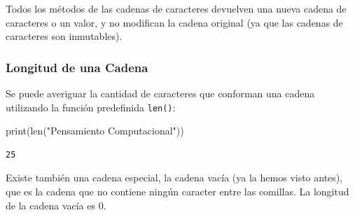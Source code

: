 \documentclass[
  letterpaper,
  DIV=11,
  numbers=noendperiod]{scrreprt}
\newenvironment{Shaded}{\begin{snugshade}}{\end{snugshade}}
\newcommand{\BuiltInTok}[1]{\textcolor[rgb]{0.00,0.23,0.31}{#1}}
\newcommand{\NormalTok}[1]{\textcolor[rgb]{0.00,0.23,0.31}{#1}}
\newcommand{\StringTok}[1]{\textcolor[rgb]{0.13,0.47,0.30}{#1}}
\begin{document}
Todos los métodos de las cadenas de caracteres devuelven una nueva
cadena de caracteres o un valor, y no modifican la cadena original (ya
que las cadenas de caracteres son inmutables).

\hypertarget{longitud-de-una-cadena}{%
\subsubsection{Longitud de una Cadena}\label{longitud-de-una-cadena}}

Se puede averiguar la cantidad de caracteres que conforman una cadena
utilizando la función predefinida \texttt{len()}:

\begin{Shaded}
\begin{Highlighting}[]
\BuiltInTok{print}\NormalTok{(}\BuiltInTok{len}\NormalTok{(}\StringTok{"Pensamiento Computacional"}\NormalTok{))}
\end{Highlighting}
\end{Shaded}

\begin{verbatim}
25
\end{verbatim}

Existe también una cadena especial, la cadena vacía (ya la hemos visto
antes), que es la cadena que no contiene ningún caracter entre las
comillas. La longitud de la cadena vacía es 0.
\end{document}
